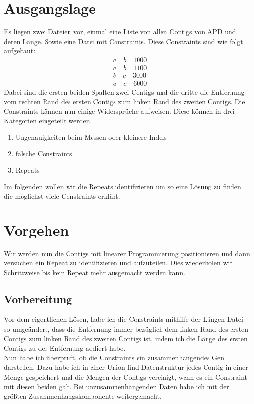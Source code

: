 \documentclass[12pt,ngerman,titlepage,a4paper]{article}
\begin{document}
\section{Ausgangslage}

Es liegen zwei Dateien vor, einmal eine Liste von allen Contigs von APD und deren Länge. Sowie eine Datei mit Constraints. Diese Constraints sind wie folgt aufgebaut:
\begin{align*}
&a \quad b \quad 1000\\
&a \quad b \quad 1100\\
&b \quad c \quad 3000\\
&a \quad c \quad 6000
\end{align*}
Dabei sind die ersten beiden Spalten zwei Contigs und die dritte die Entfernung vom rechten Rand des ersten Contigs zum linken Rand des zweiten Contigs. Die Constraints können nun einige Widersprüche aufweisen. Diese können in drei Kategorien eingeteilt werden. 
\begin{enumerate}
\item Ungenauigkeiten beim Messen oder kleinere Indels
\item falsche Constraints
\item Repeats
\end{enumerate}
Im folgenden wollen wir die Repeats identifizieren um so eine Lösung zu finden die möglichst viele Constraints erklärt.
\section{Vorgehen}
Wir werden nun die Contigs mit linearer Programmierung positionieren und dann versuchen ein Repeat zu identifizieren und aufzuteilen. Dies wiederholen wir Schrittweise bis kein Repeat mehr ausgemacht werden kann.
\subsection{Vorbereitung}
Vor dem eigentlichen Lösen, habe ich die Constraints mithilfe der Längen-Datei so umgeändert, dass die Entfernung immer bezüglich dem linken Rand des ersten Contigs zum linken Rand des zweiten Contigs ist, indem ich die Länge des ersten Contigs zu der Entfernung addiert habe.\\
Nun habe ich überprüft, ob die Constraints ein zusammenhängendes Gen darstellen. Dazu habe ich in einer Union-find-Datenstruktur jedes Contig in einer Menge gespeichert und die Mengen der Contigs vereinigt, wenn es ein Constraint mit diesen beiden gab.
Bei unzusammenhängenden Daten habe ich mit der größten Zusammenhangskomponente weitergemacht.
\end{document}
